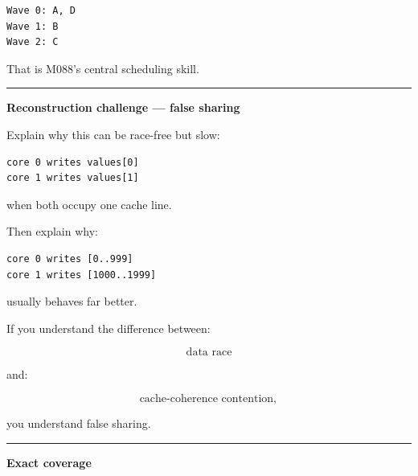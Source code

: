 \begin{verbatim}
Wave 0: A, D
Wave 1: B
Wave 2: C
\end{verbatim}

That is M088's central scheduling skill.

\begin{center}\rule{0.5\linewidth}{0.5pt}\end{center}

\textbf{Reconstruction challenge --- false sharing}

Explain why this can be race-free but slow:

\begin{verbatim}
core 0 writes values[0]
core 1 writes values[1]
\end{verbatim}

when both occupy one cache line.

Then explain why:

\begin{verbatim}
core 0 writes [0..999]
core 1 writes [1000..1999]
\end{verbatim}

usually behaves far better.

If you understand the difference between:

\[
\text{data race}
\]

and:

\[
\text{cache-coherence contention},
\]

you understand false sharing.

\begin{center}\rule{0.5\linewidth}{0.5pt}\end{center}

\textbf{Exact coverage}

